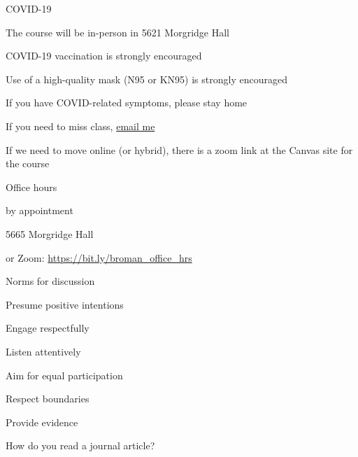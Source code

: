 \documentclass[aspectratio=169,12pt,t]{beamer}
\begin{document}
\begin{frame}{COVID-19}

  \bbi
\item The course will be in-person in 5621 Morgridge Hall
\item COVID-19 vaccination is strongly encouraged
\item Use of a high-quality mask (N95 or KN95) is strongly encouraged
\item If you have COVID-related symptoms, please stay home
\item If you need to miss class, \href{mailto:broman@wisc.edu}{email me}
\item If we need to move online (or hybrid), there is a zoom link at
  the Canvas site for the course
  \ei

\end{frame}




\begin{frame}{Office hours}

  \bbi
\item {\hilit by appointment}
\item 5665 Morgridge Hall
\item or Zoom: \url{https://bit.ly/broman_office_hrs}
\ei

\end{frame}






\begin{frame}{Norms for discussion}

      \bbi
    \item Presume positive intentions
    \item Engage respectfully
    \item Listen attentively
    \item Aim for equal participation
    \item Respect boundaries
    \item Provide evidence
      \ei

\end{frame}




\begin{frame}[c]{}

\centerline{\Large \color{title} How do you read a journal article?}

\end{frame}
\end{document}
